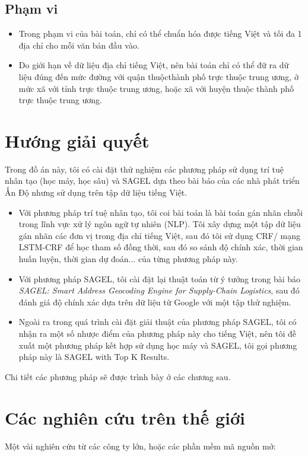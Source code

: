 \subsection{Phạm vi}
\begin{itemize}
    \item Trong phạm vi của bài toán, chỉ có thể chuẩn hóa được tiếng Việt và tối đa 1 địa chỉ cho mỗi văn bản đầu vào.
    \item Do giới hạn về dữ liệu địa chỉ tiếng Việt, nên bài toán chỉ có thể đữ ra dữ liệu đúng đến mức đường với quận thuộcthành phố trực thuộc trung ương, ở mức xã với tỉnh trực thuộc trung ương, hoặc xã với huyện thuộc thành phố trực thuộc trung ương.
\end{itemize}
\section{Hướng giải quyết}
Trong đồ án này, tôi có cài đặt thử nghiệm các phương pháp sử dụng trí tuệ nhân tạo (học máy, học sâu) và SAGEL dựa theo bài báo của các nhà phát triển Ấn Độ nhưng sử dụng trên tập dữ liệu tiếng Việt.
\begin{itemize}
    \item Với phương pháp trí tuệ nhân tạo, tôi coi bài toán là bài toán gán nhãn chuỗi trong lĩnh vực xử lý ngôn ngữ tự nhiên (NLP). Tôi xây dựng một tập dữ liệu gán nhãn các đơn vị trong địa chỉ tiếng Việt, sau đó tôi sử dụng CRF/ mạng LSTM-CRF để học tham số đồng thời, sau đó so sánh độ chính xác, thời gian huấn luyện, thời gian dự đoán... của từng phương pháp này.
    \item Với phương pháp SAGEL, tôi cài đặt lại thuật toán từ ý tưởng trong bài báo \textit{SAGEL: Smart Address Geocoding Engine for Supply-Chain Logistics}, sau đó đánh giá độ chính xác dựa trên dữ liệu từ Google với một tập thử nghiệm.
    \item Ngoài ra trong quá trình cài đặt giải thuật của phương pháp SAGEL, tôi có nhận ra một số nhược điểm của phương pháp này cho tiếng Việt, nên tôi đề xuất một phương pháp kết hợp sử dụng học máy và SAGEL, tôi gọi phương pháp này là SAGEL with Top K Results.
\end{itemize}
Chi tiết các phương pháp sẽ được trình bày ở các chương sau.

\section{Các nghiên cứu trên thế giới}
Một vài nghiên cứu từ các công ty lớn, hoặc các phần mềm mã nguồn mở:

